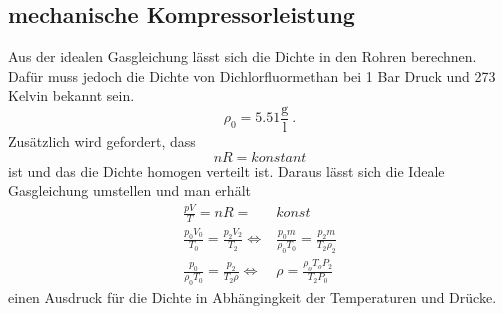 \subsection{mechanische Kompressorleistung}
Aus der idealen Gasgleichung lässt sich die Dichte in den Rohren berechnen. Dafür muss jedoch die Dichte von Dichlorfluormethan bei 1 Bar Druck und 273 Kelvin bekannt sein.
\begin{equation}
  \rho_\text{0} =  5.51 \frac{\text{g}}{\text{l}} \ .
  \label{rho}
\end{equation}
Zusätzlich wird gefordert, dass
\begin{equation}
  nR = konstant
\end{equation}
ist und das die Dichte homogen verteilt ist. Daraus lässt sich die Ideale Gasgleichung umstellen und man erhält
\begin{eqnarray*}
  \frac{pV}{T} =nR =& konst \\
  \frac{p_0 V_0}{T_0} = \frac{p_2 V_2}{T_\text{2}}  \Leftrightarrow&  \frac{p_0 m}{\rho_0 T_0} = \frac{p_2 m}{T_\text{2} \rho_2} \\
  \frac{p_0}{\rho_0 T_0} = \frac{p_2}{T_\text{2} \rho} \Leftrightarrow& \rho = \frac{\rho_o T_o P_2}{T_\text{2} P_0}
  \label{eqn:rho}
\end{eqnarray*}
einen Ausdruck für die Dichte in Abhängingkeit der Temperaturen und Drücke.
